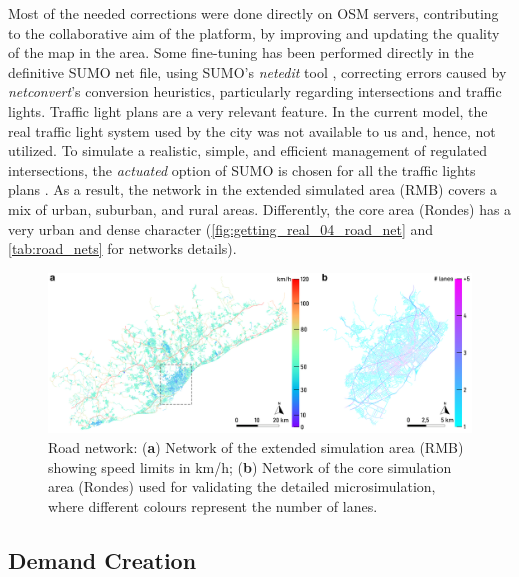 Most of the needed corrections were done directly on OSM servers, contributing to the collaborative aim of the platform, by improving and updating the quality of the map in the area. Some fine-tuning has been performed directly in the definitive SUMO net file, using SUMO’s \emph{netedit} tool \citep{GermanAerospaceCenterDLRandothers2021c}, correcting errors caused by \emph{netconvert}’s conversion heuristics, particularly regarding intersections and traffic lights. Traffic light plans are a very relevant feature. In the current model, the real traffic light system used by the city was not available to us and, hence, not utilized. To simulate a realistic, simple, and efficient management of regulated intersections, the \emph{actuated} option of SUMO is chosen for all the traffic lights plans \citep{Koonce2008}. As a result, the network in the extended simulated area (RMB) covers a mix of urban, suburban, and rural areas. Differently, the core area (Rondes) has a very urban and dense character  (\autoref{fig:getting_real_04_road_net} and \autoref{tab:road_nets} for networks details).

\begin{figure}[htbp!]
    \centering
    \includegraphics[width=1\textwidth]{fig_04.png}
    \caption{Road network: (\textbf{a}) Network of the extended simulation area (RMB) showing speed limits in km/h; (\textbf{b}) Network of the core simulation area (Rondes) used for validating the detailed microsimulation, where different colours represent the number of lanes.}
   \label{fig:getting_real_04_road_net}
\end{figure}



\subsection{Demand Creation}

